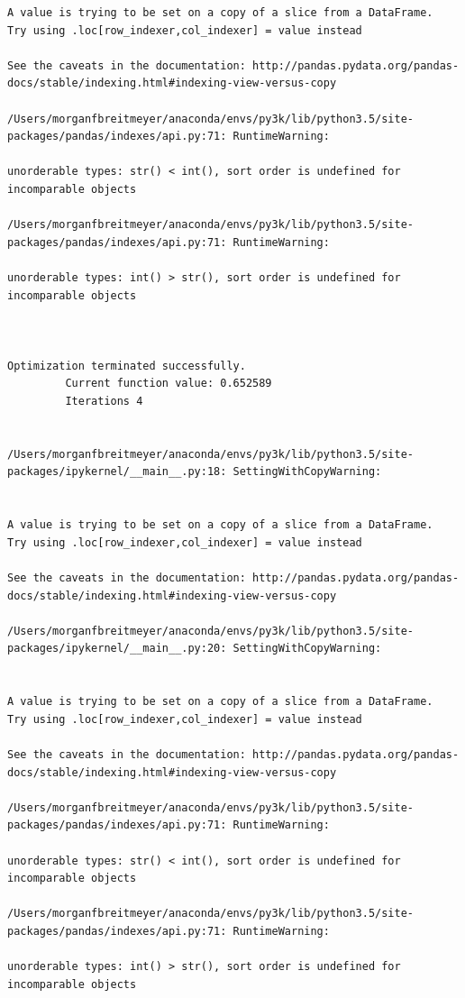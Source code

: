 \begin{lstlisting}
A value is trying to be set on a copy of a slice from a DataFrame.
Try using .loc[row_indexer,col_indexer] = value instead

See the caveats in the documentation: http://pandas.pydata.org/pandas-docs/stable/indexing.html#indexing-view-versus-copy

/Users/morganfbreitmeyer/anaconda/envs/py3k/lib/python3.5/site-packages/pandas/indexes/api.py:71: RuntimeWarning:

unorderable types: str() < int(), sort order is undefined for incomparable objects

/Users/morganfbreitmeyer/anaconda/envs/py3k/lib/python3.5/site-packages/pandas/indexes/api.py:71: RuntimeWarning:

unorderable types: int() > str(), sort order is undefined for incomparable objects



Optimization terminated successfully.
         Current function value: 0.652589
         Iterations 4


/Users/morganfbreitmeyer/anaconda/envs/py3k/lib/python3.5/site-packages/ipykernel/__main__.py:18: SettingWithCopyWarning:


A value is trying to be set on a copy of a slice from a DataFrame.
Try using .loc[row_indexer,col_indexer] = value instead

See the caveats in the documentation: http://pandas.pydata.org/pandas-docs/stable/indexing.html#indexing-view-versus-copy

/Users/morganfbreitmeyer/anaconda/envs/py3k/lib/python3.5/site-packages/ipykernel/__main__.py:20: SettingWithCopyWarning:


A value is trying to be set on a copy of a slice from a DataFrame.
Try using .loc[row_indexer,col_indexer] = value instead

See the caveats in the documentation: http://pandas.pydata.org/pandas-docs/stable/indexing.html#indexing-view-versus-copy

/Users/morganfbreitmeyer/anaconda/envs/py3k/lib/python3.5/site-packages/pandas/indexes/api.py:71: RuntimeWarning:

unorderable types: str() < int(), sort order is undefined for incomparable objects

/Users/morganfbreitmeyer/anaconda/envs/py3k/lib/python3.5/site-packages/pandas/indexes/api.py:71: RuntimeWarning:

unorderable types: int() > str(), sort order is undefined for incomparable objects




\end{lstlisting}
